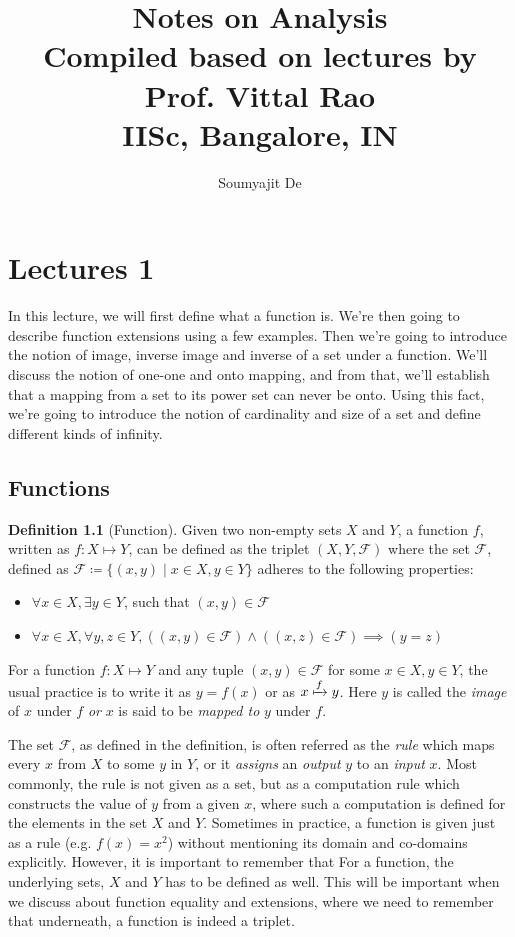 \documentclass{report}
\theoremstyle{plain}
\theoremstyle{definition}
\newtheorem{definition}[theorem]{Definition} %
\begin{document}
\title{Notes on Analysis\\
	\Large Compiled based on lectures by Prof. Vittal Rao\\
	\large IISc, Bangalore, IN}
\author{Soumyajit De}

\maketitle
\tableofcontents
\chapter{Lectures 1}
In this lecture, we will first define what a function is. We're then going to describe function extensions using a few examples. Then we're going to introduce the notion of image, inverse image and inverse of a set under a function. We'll discuss the notion of one-one and onto mapping, and from that, we'll establish that a mapping from a set to its power set can never be onto. Using this fact, we're going to introduce the notion of cardinality and size of a set and define different kinds of infinity.
\section{Functions}
\begin{definition}[Function]
Given two non-empty sets $X$ and $Y$, a function $f$, written as $f:X\mapsto Y$, can be defined as the triplet $(X,Y,\mathcal{F})$ where the set $\mathcal{F}$, defined as $\mathcal{F}\coloneqq\{(x,y) \mid x\in X,y\in Y\}$ adheres to the following properties:
\begin{itemize}
\item $\forall x\in X,\exists y\in Y$, such that $(x,y)\in\mathcal{F}$
\item $\forall x\in X,\forall y,z\in Y,\left((x,y)\in\mathcal{F}\right)\wedge\left((x,z)\in\mathcal{F}\right)\implies (y=z)$
\end{itemize}
\end{definition}
\noindent For a function $f:X\mapsto Y$ and any tuple $(x,y)\in\mathcal{F}$ for some $x\in X,y\in Y$, the usual practice is to write it as $y=f(x)$ or as $x\xmapsto[]{f}y$. Here $y$ is called the \emph{image} of $x$ under $f$ \emph{or} $x$ is said to be \emph{mapped to} $y$ under $f$.

The set $\mathcal{F}$, as defined in the definition, is often referred as the \emph{rule} which maps every $x$ from $X$ to some $y$ in $Y$, or it \emph{assigns} an \emph{output} $y$ to an \emph{input} $x$. Most commonly, the rule is not given as a set, but as a computation rule which constructs the value of $y$ from a given $x$, where such a computation is defined for the elements in the set $X$ and $Y$. Sometimes in practice, a function is given just as a rule (e.g. $f(x)=x^2$) without mentioning its domain and co-domains explicitly. However, it is important to remember that For a function, the underlying sets, $X$ and $Y$ has to be defined as well. This will be important when we discuss about function equality and extensions, where we need to remember that underneath, a function is indeed a triplet.
\end{document}
